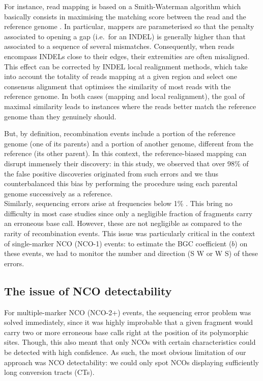 For instance, read mapping is based on a Smith-Waterman algorithm which basically consists in maximising the matching score between the read and the reference genome \citep{smith1981identification}.
In particular, mappers are parameterised so that the penalty associated to opening a gap (i.e.\ for an INDEL) is generally higher than that associated to a sequence of several mismatches.
Consequently, when reads encompass INDELs close to their edges, their extremities are often misaligned.
This effect can be corrected by INDEL local realignment methods, which take into account the totality of reads mapping at a given region and select one consensus alignment that optimises the similarity of most reads with the reference genome.
In both cases (mapping and local realignment), the goal of maximal similarity leads to instances where the reads better match the reference genome than they genuinely should.

But, by definition, recombination events include a portion of the reference genome (one of its parents) and a portion of another genome, different from the reference (its other parent).
In this context, the reference-biased mapping can disrupt immensely their discovery: in this study, we observed that over 98\% of the false positive discoveries originated from such errors and we thus counterbalanced this bias by performing the procedure using each parental genome successively as a reference.\\

Similarly, sequencing errors arise at frequencies below 1\% \citep{fox2014accuracy,pfeiffer2018systematic}.
This bring no difficulty in most case studies since only a negligible fraction of fragments carry an erroneous base call.
However, these are not negligible as compared to the rarity of recombination events.
This issue was particularly critical in the context of single-marker NCO (NCO-1) events:
to estimate the BGC coefficient ($b$) on these events, we had to monitor the number and direction (S\textrightarrow{} W or W\textrightarrow{} S) of these errors.




\subsection{The issue of NCO detectability}

For multiple-marker NCO (NCO-2+) events, the sequencing error problem was solved immediately, since it was highly improbable that a given fragment would carry two or more erroneous base calls right at the position of its polymorphic sites.
Though, this also meant that only NCOs with certain characteristics could be detected with high confidence.
As such, the most obvious limitation of our approach was NCO detectability: we could only spot NCOs displaying sufficiently long conversion tracts (CTs).

